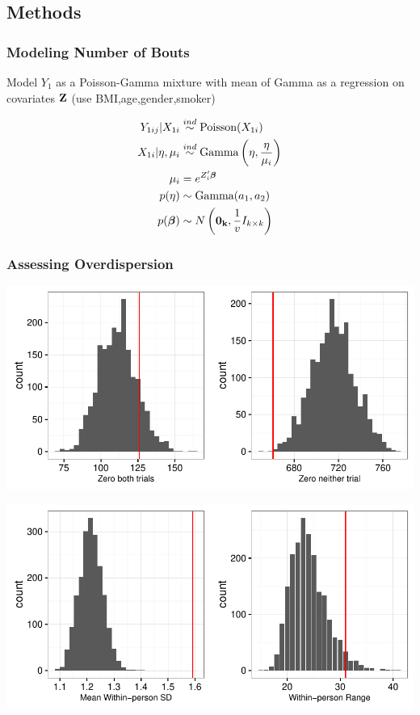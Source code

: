 \documentclass[handout]{beamer}\usepackage[]{graphicx}\usepackage[]{color}
\begin{document}
\subsection{Methods}

\begin{frame}
\frametitle{Modeling Number of Bouts}
Model $Y_1$ as a Poisson-Gamma mixture with mean of Gamma as a regression on covariates ${\bf Z}$ (use BMI,age,gender,smoker)

\begin{align*}
	Y_{1ij} | X_{1i} &\overset{ind}{\sim} \text{Poisson}(X_{1i}) \\
	X_{1i} | \eta,\mu_i &\overset{ind}{\sim} \text{Gamma} \left( \eta,\frac{\eta}{\mu_i} \right) \\
	\mu_i &= e^{Z_i' \boldsymbol{\beta}} \\
	p(\eta) &\sim \text{Gamma}(a_1,a_2) \\
	p(\boldsymbol{\beta}) &\sim N \left( {\bf 0_k}, \frac{1}{v} I_{k \times k} \right)
\end{align*}

\end{frame}


\begin{frame}
\frametitle{Assessing Overdispersion}

\centering
\includegraphics{y1ppmarg}

\includegraphics{y1ppcond}


\end{frame}
\end{document}
